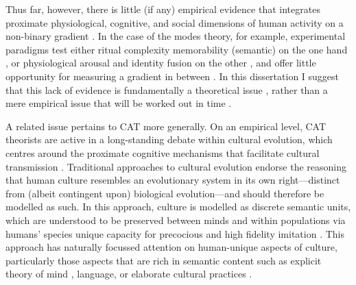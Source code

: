 \begin{CJK}{UTF8}{gbsn}
Thus far, however, there is little (if any) empirical evidence that integrates proximate physiological, cognitive, and social dimensions of human activity on a non-binary gradient \citep{Atran2010}.  In the case of the modes theory, for example, experimental paradigms test either ritual complexity memorability (semantic) on the one hand \citep{Whitehouse2005}, or physiological arousal and identity fusion on the other \citep{Whitehouse2014,Whitehouse2017,Swann2010a,Richert2005}, and offer little opportunity for measuring a gradient in between \citep[but see][]{Russell2014}.  In this dissertation I suggest that this lack of evidence is fundamentally a theoretical issue \citep{Clark2015}, rather than a mere empirical issue that will be worked out in time \citep[cf.][]{Whitehouse2014a}.

A related issue pertains to CAT more generally.  On an empirical level, CAT theorists are active in a long-standing debate within cultural evolution, which centres around the proximate cognitive mechanisms that facilitate cultural transmission \citep{Acerbi2015,Scott-Phillips2018}.  Traditional approaches to cultural evolution endorse the reasoning that human culture resembles an evolutionary system in its own right---distinct from (albeit contingent upon) biological evolution---and should therefore be modelled as such.  In this approach, culture is modelled as discrete semantic units, which are understood to be preserved between minds and within populations via humans' species unique capacity for precocious and high fidelity imitation \citep[i.e., like genes, culture is preserved through processes of exact replication with natural copying error and drift][]{Henrich2003,Tomasello2011}. This approach has naturally focussed attention on human-unique aspects of culture, particularly those aspects that are rich in semantic content such as explicit theory of mind \citep{Tomasello2005}, language, or elaborate cultural practices \citep{}.


\end{CJK}
